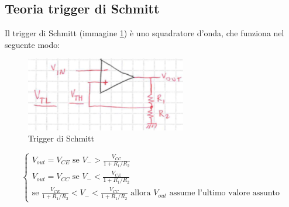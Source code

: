 \documentclass{article}
\begin{document}
		\subsection{Teoria trigger di Schmitt}
			Il trigger di Schmitt (immagine \ref{fig:smith}) è uno squadratore d'onda, che funziona nel seguente modo:\newline
			\begin{figure}
				\label{fig:smith}
				\centering
				\includegraphics[width=70mm]{immagini/smitha.png}
				\caption{Trigger di Schmitt}
			\end{figure}
			\begin{equation}
				\begin{cases}
					V_{out}=V_{CE}\textrm{ se }V_->\frac{V_{CC}}{1+R_1/R_2}\\
					V_{out}=V_{CC}\textrm{ se }V_-<\frac{V_{CE}}{1+R_1/R_2}\\
					\textrm{se }\frac{V_{CE}}{1+R_1/R_2}<V_-<\frac{V_{CC}}{1+R_1/R_2}\textrm{ allora }V_{out}\textrm{ assume l'ultimo valore assunto}
				\end{cases}
			\end{equation}
\end{document}

